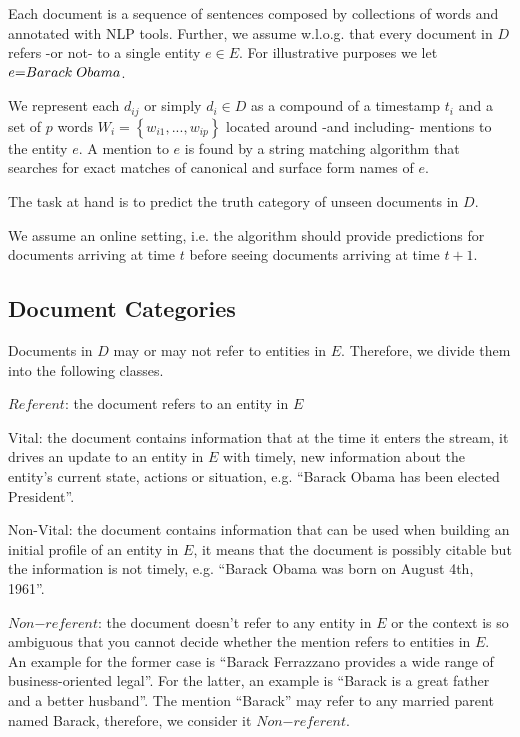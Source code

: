\documentclass{article}
\begin{document}
Each document is a sequence of sentences composed by collections of words and annotated with NLP tools.
Further, we assume w.l.o.g. that every document in $D$ refers -or not- to a single entity $e \in E$. For illustrative purposes we let $e\mathord{=}Barack\hspace{1mm}Obama$.

We represent each $d_{ij}$ or simply $d_i \in D$ as a compound of a timestamp $t_i$ and a set of $p$ words $W_i = \left\{ {w_{i1}, ..., w_{ip}}\right\}$ located around -and including- mentions to the entity $e$. A mention to $e$ is found by a string matching algorithm that searches for exact matches of canonical and surface form names of $e$.

The task at hand is to predict the truth category of unseen documents in $D$.

We assume an online setting, i.e. the algorithm should provide predictions for documents arriving at time $t$ before seeing documents arriving at time $t+1$. 

\subsection{Document Categories}
\label{categories}

Documents in $D$ may or may not refer to entities in $E$. Therefore, we divide them into the following classes.

\begin{itemize*}
  \item $Referent$: the document refers to an entity in $E$
    \begin{itemize*}
      \item Vital: the document contains information that at the time it enters the stream, it drives an update to an entity in $E$ with timely, new information about the entity's current state, actions or situation, e.g. ``Barack Obama has been elected President''.
      \item Non-Vital: the document contains information that can be used when building an initial profile of an entity in $E$, it means that the document is possibly citable but the information is not timely, e.g. ``Barack Obama was born on August 4th, 1961''.
    \end{itemize*}
  \item $Non\mathord{-}referent$: the document doesn't refer to any entity in $E$ or the context is so ambiguous that you cannot decide whether the mention refers to entities in $E$. An example for the former case is ``Barack Ferrazzano provides a wide range of business-oriented legal''. For the latter, an example is ``Barack is a great father and a better husband''. The mention ``Barack'' may refer to any married parent named Barack, therefore, we consider it $Non\mathord{-}referent$.

\end{itemize*}
\end{document}
